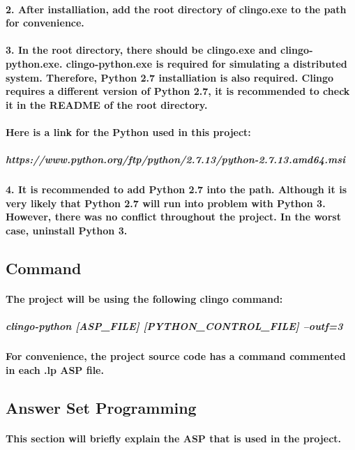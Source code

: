 \documentclass{article}
\begin{document}
	\paragraph{2. After installiation, add the root directory of clingo.exe to the path for convenience.}
	\paragraph{3. In the root directory, there should be clingo.exe and clingo-python.exe. clingo-python.exe is required for simulating a distributed system. Therefore, Python 2.7 installiation is also required. Clingo requires a different version of Python 2.7, it is recommended to check it in the README of the root directory.}
	\paragraph{Here is a link for the Python used in this project:}
	\subparagraph{https://www.python.org/ftp/python/2.7.13/python-2.7.13.amd64.msi}
	\paragraph{4. It is recommended to add Python 2.7 into the path. Although it is very likely that Python 2.7 will run into problem with Python 3. However, there was no conflict throughout the project. In the worst case, uninstall Python 3.}
	
	\subsection{Command}
	\paragraph{The project will be using the following clingo command:}
	\subparagraph{clingo-python [ASP\_FILE] [PYTHON\_CONTROL\_FILE] --outf=3}
	\paragraph{For convenience, the project source code has a command commented in each .lp ASP file.}
	
	\subsection{Answer Set Programming}
	\paragraph{This section will briefly explain the ASP that is used in the project.}
	
\end{document}
